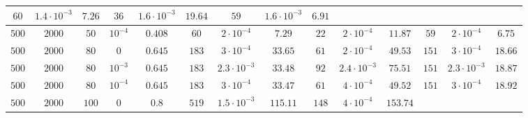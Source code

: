\documentclass[twocolumn]{svjour3}
\begin{document}
\begin{table*} [!htp]
\begin{center}
\begin{tabular}{|c|c|c|c|c|c|c|c|c|c|c|c|c|c}
\multicolumn{1}{|c}{$60$} & \multicolumn{1}{c}{$1.4 \cdot 10^{-3}$} & \multicolumn{1}{c|}{$7.26$} &
\multicolumn{1}{|c}{$36$} & \multicolumn{1}{c}{$1.6 \cdot 10^{-3}$} & \multicolumn{1}{c}{$19.64$} &
\multicolumn{1}{|c}{$59$} & \multicolumn{1}{c}{$1.6 \cdot 10^{-3}$} & \multicolumn{1}{c}{$\mathbf{6.91}$} \\
\hline
\multicolumn{1}{c}{$500$} & \multicolumn{1}{c}{$2000$} & \multicolumn{1}{c}{$50$}  & \multicolumn{1}{c|}{$10^{-4}$} & $ 0.408 $ & 
\multicolumn{1}{|c}{$60$} & \multicolumn{1}{c}{$2 \cdot 10^{-4}$} & \multicolumn{1}{c|}{$7.29$} &
\multicolumn{1}{|c}{$22$} & \multicolumn{1}{c}{$2 \cdot 10^{-4}$} & \multicolumn{1}{c}{$11.87$} &
\multicolumn{1}{|c}{$59$} & \multicolumn{1}{c}{$2 \cdot 10^{-4}$} & \multicolumn{1}{c}{$\mathbf{6.75}$} \\
\hline
\multicolumn{1}{c}{$500$} & \multicolumn{1}{c}{$2000$} & \multicolumn{1}{c}{$80$}  & \multicolumn{1}{c|}{$0$} & $ 0.645 $ & 
\multicolumn{1}{|c}{$183$} & \multicolumn{1}{c}{$3 \cdot 10^{-4}$} & \multicolumn{1}{c|}{$33.65$} &
\multicolumn{1}{|c}{$61$} & \multicolumn{1}{c}{$2 \cdot 10^{-4}$} & \multicolumn{1}{c}{$49.53$} &
\multicolumn{1}{|c}{$151$} & \multicolumn{1}{c}{$3 \cdot 10^{-4}$} & \multicolumn{1}{c}{$\mathbf{18.66}$} \\
\hline
\multicolumn{1}{c}{$500$} & \multicolumn{1}{c}{$2000$} & \multicolumn{1}{c}{$80$}  & \multicolumn{1}{c|}{$10^{-3}$} & $ 0.645 $ & 
\multicolumn{1}{|c}{$183$} & \multicolumn{1}{c}{$2.3 \cdot 10^{-3}$} & \multicolumn{1}{c|}{$33.48$} &
\multicolumn{1}{|c}{$92$} & \multicolumn{1}{c}{$2.4 \cdot 10^{-3}$} & \multicolumn{1}{c}{$75.51$} &
\multicolumn{1}{|c}{$151$} & \multicolumn{1}{c}{$2.3 \cdot 10^{-3}$} & \multicolumn{1}{c}{$\mathbf{18.87}$} \\
\hline
\multicolumn{1}{c}{$500$} & \multicolumn{1}{c}{$2000$} & \multicolumn{1}{c}{$80$}  & \multicolumn{1}{c|}{$10^{-4}$} & $ 0.645 $ & 
\multicolumn{1}{|c}{$183$} & \multicolumn{1}{c}{$3 \cdot 10^{-4}$} & \multicolumn{1}{c|}{$33.47$} &
\multicolumn{1}{|c}{$61$} & \multicolumn{1}{c}{$4 \cdot 10^{-4}$} & \multicolumn{1}{c}{$49.52$} &
\multicolumn{1}{|c}{$151$} & \multicolumn{1}{c}{$3 \cdot 10^{-4}$} & \multicolumn{1}{c}{$\mathbf{18.92}$} \\
\hline
\multicolumn{1}{c}{$500$} & \multicolumn{1}{c}{$2000$} & \multicolumn{1}{c}{$100$}  & \multicolumn{1}{c|}{$0$} & $ 0.8 $ & 
\multicolumn{1}{|c}{$519$} & \multicolumn{1}{c}{$1.5 \cdot 10^{-3}$} & \multicolumn{1}{c|}{$115.11$} &
\multicolumn{1}{|c}{$148$} & \multicolumn{1}{c}{$4 \cdot 10^{-4}$} & \multicolumn{1}{c}{$153.74$} &

\end{tabular}
\end{center}
\end{table*}
\end{document}
